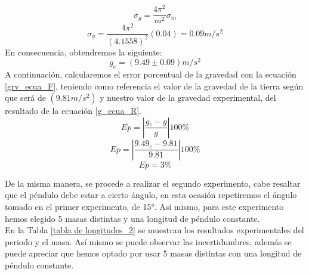 \documentclass[10pt,a4paper]{article}
\begin{document}
\begin{multicols}{2}
\begin{equation}
	\sigma_{g}=\frac{4\pi^2}{m^2}\sigma_{m}
	\label{g_incer_F}
\end{equation}
\begin{equation}
	\sigma_{g}=\frac{4\pi^{2}}{(4.1558)^2}(0.04) = 0.09m/s^2
	\label{g_incer_R}
\end{equation}
En consecuencia, obtendremos la siguiente:
\begin{equation}
	g_{e} = (9.49 \pm 0.09)  m/s^2
\end{equation}
A continuación, calcularemos el error porcentual de la gravedad con la ecuación \ref{grv_ecua_F}, teniendo como referencia el valor de la gravedad de la tierra según \cite{lange2012gravitacion} que será de $(9.81 m/s^2)$ y nuestro valor de la gravedad experimental, del resultado de la ecuación \ref{g_ecua_R}.
\begin{equation}
		Ep = \left | \frac{g{_{e}-g}}{g}\right |100\% 
		\label{grv_ecua_F}
\end{equation}
\begin{equation}
	Ep =\left |  \frac{9.49{_{e}-9.81}}{9.81} \right |100\% 
	\label{gr_ecua_for}
\end{equation}
\begin{equation}
	Ep = 3\%
	\label{gr_valor}
\end{equation}
\end{multicols}
\begin{multicols}{2}

De la misma manera, se procede a realizar el segundo experimento, cabe resaltar que el péndulo debe estar a cierto ángulo, en esta ocasión repetiremos el ángulo tomado en el primer experimento, de 15°. Así mismo, para este experimento hemos elegido 5 masas distintas y una longitud de péndulo constante.\\
En la Tabla \ref{tabla de longitudes_2} se muestran los resultados experimentales del periodo y el masa. Así mismo se puede observar las incertidumbres, además se puede apreciar que hemos optado por usar 5 masas distintas con una longitud de péndulo constante.
\end{multicols}
\end{document}
